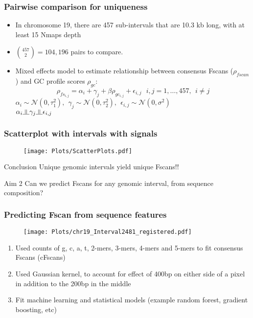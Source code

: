 \documentclass[10pt,dvipsnames,table]{beamer}
\begin{document}
\begin{frame}
\frametitle{Pairwise comparison for uniqueness}
\begin{itemize}
\item In chromosome 19, there are 457 sub-intervals that are 10.3 kb long, with at least 15 Nmaps depth
\item $ \binom {457} {2} = 104,196 $ pairs to compare. 
\item Mixed effects model to estimate relationship between consensus Fscans ($\rho_{fscan}$) and GC profile scores $\rho_{gc}$:
\[ 
\rho_{fs_{i,j}} = \alpha_i + \gamma_j + \beta \rho_{gc_{i,j}} + \epsilon_{i,j}\ \ \ i, j = 1, \dots, 457,\ \ i \ne j
\]
$\alpha_i \sim \mathcal{N}(0, \tau_1^2), \ \ \gamma_j \sim \mathcal{N}(0, \tau_2^2), \ \ \epsilon_{i,j} \sim \mathcal{N}(0, \sigma^2)$ \\
$ \alpha_i \indep \gamma_j \indep \epsilon_{i,j}$
\end{itemize}

\end{frame}

\begin{frame}
\frametitle{Scatterplot with intervals with signals}
\begin{figure}
\centering
\texttt{[image: Plots/ScatterPlots.pdf]}
\end{figure}

\begin{block}{Conclusion}
Unique genomic intervals yield unique Fscans!!
\end{block}

\end{frame}

\begin{frame}
\Large
\begin{block}{Aim 2}
Can we predict Fscans for any genomic interval, from sequence composition?
\end{block}
\end{frame}

\begin{frame}
\frametitle{Predicting Fscan from sequence features}
\vspace{-0.5cm}
\begin{figure}
\centering
\texttt{[image: Plots/chr19\_Interval2481\_registered.pdf]}
\end{figure}
\vspace{-0.5cm}
\begin{enumerate}
\item Used counts of g, c, a, t, 2-mers, 3-mers, 4-mers and 5-mers to fit consensus Fscans (cFscans)
\item Used Gaussian kernel, to account for effect of 400bp on either side of a pixel in addition to the 200bp in the middle
\item Fit machine learning and statistical models (example random forest, gradient boosting, etc)
\end{enumerate}

\end{frame}
\end{document}
